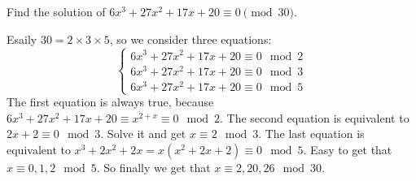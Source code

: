 \documentclass{ctexart}
\newif\ifpreface
\begin{document}
\large
\setlength{\baselineskip}{1.2em}
\ifpreface

\else
{}
\begin{problem}\label{pro:1}
  Find the solution of \(6x^3 + 27 x^2 + 17x + 20 \equiv 0 \pmod{ 30}\).
\end{problem}
\begin{solution}
  Esaily \(30=2\times3\times5\), so we consider three equations:
  \[
    \begin{cases}
      6x^3 + 27 x^2 + 17x + 20 \equiv 0 \mod 2 \\
      6x^3 + 27 x^2 + 17x + 20 \equiv 0 \mod 3 \\
      6x^3 + 27 x^2 + 17x + 20 \equiv 0 \mod 5
    \end{cases}
  \]
  The first equation is always true, because \(6x^3 + 27 x^2 + 17x + 20 \equiv x^{2+x} \equiv 0 \mod 2\).
  The second equation is equivalent to \(2x+2 \equiv 0 \mod 3\). Solve it and get \(x \equiv 2 \mod 3\).
  The last equation is equivalent to \(x^3+2x^2+2x =x(x^2+2x+2)\equiv 0 \mod 5\).
  Easy to get that \(x \equiv 0,1,2 \mod 5\).
  So finally we get that \(x \equiv 2,20,26 \mod 30\).
\end{solution}
\end{document}
